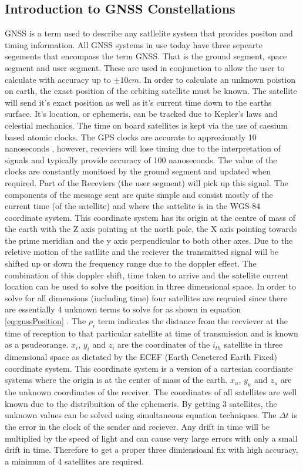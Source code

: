 \subsection{Introduction to GNSS Constellations}\label{subsec:GNSS_Intro}
GNSS is a term used to describe any satllelite system that provides positon and timing information. All GNSS systems in use today have three sepearte segements that
encompass the term GNSS. That is the ground segment, space segment and user segment. These are used in conjunction to allow the user to calculate with accuracy up to $\pm
10cm$. In order to calculate an unknown poistion on earth, the exact position of the orbiting satellite must be known. The satellite will send it's exact position as well
as it's current time down to the earths surface. It's location, or ephemeris, can be tracked due to Kepler's laws and celestial mechanics. The time on board satellites is
kept via the use of caesium based atomic clocks. The GPS clocks are accurate to approximatly 10 nanoseconds , however, receviers will lose timing due to
the interpretation of signals and typically provide accuracy of 100 nanoseconds. The value of the clocks are constantly monitoed by the ground segment and updated when
required. Part of the Receviers (the user segment) will pick up this signal. The components of the message sent are quite simple and consist mostly of the current time
(of the satellite) and where the sattelite is in the WGS-84 coordinate system\cite{RN46}. This coordinate system has its origin at the centre of mass of the earth with
the Z axis pointing at the north pole, the X axis pointing towards the prime meridian and the y axis perpendicular to both other axes. Due to the reletive motion of the
satllite and the reciever the transmitted signal will be shifted up or down the frequency range due to the doppler effect. The combination of this doppler shift, time
taken to arrive and the satellite current location can be used to solve the position in three dimensional space. In order to solve for all dimensions (including time)
four satellites are reqruied since there are essentially 4 unknown terms to solve for as shown in equation \ref{eq:gnssPosition} \cite{RN46}. The $\rho_i$ term indicates
the distance from the recviever at the time of reception to that particular satellite at time of transmission  and is known as a psudeorange. $x_i$, $y_i$ and $z_i$ are
the coordinates of the $i_{th}$ satellite in three dimensional space as dictated by the ECEF (Earth Cenetered Earth Fixed) coordinate system. This coordinate system is a
version of a cartesian coordiante systems where the origin is at the center of mass of the earth. $x_u$, $y_u$ and $z_u$ are the unknown coordinates of the receiver. The
coordinates of all satellites are well known due to the distribuition of the ephemeris. By getting 3 satellites, the unknown values can be solved using simultaneous
equation techniques. The $\Delta t$ is the error in the clock of the sender and reciever. Any drift in time will be multiplied by the speed of light and can cause very
large errors with only a small drift in time. Therefore to get a proper three dimiensioanl fix with high accuracy, a minimum of 4 satellites are required.  

